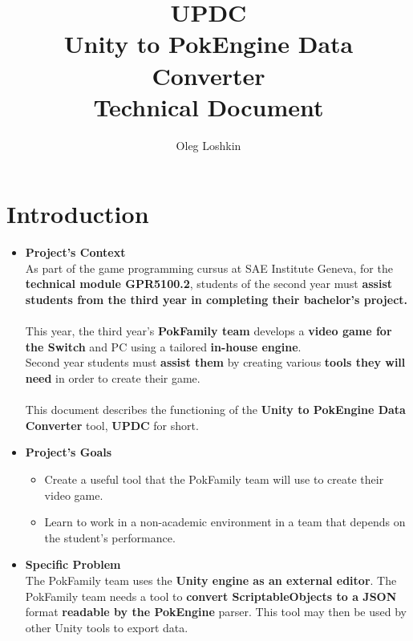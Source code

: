 \documentclass[12pt,a4paper]{article}
\author{Oleg Loshkin}
\title{\textbf{UPDC}\\Unity to PokEngine Data Converter\\\textbf{Technical Document}}
\begin{document}
\maketitle
\section{Introduction}
	\begin{itemize}
		\item \textbf{Project's Context}
		\\As part of the game programming cursus at SAE Institute Geneva, for the \textbf{technical module GPR5100.2}, students of the second year must \textbf{assist students from the third year in completing their bachelor’s project.}\\\\
		This year, the third year's \textbf{PokFamily team} develops a \textbf{video game for the Switch} and PC using a tailored \textbf{in-house engine}.\\Second year students must \textbf{assist them} by creating various \textbf{tools they will need} in order to create their game.\\\\
		This document describes the functioning of the \textbf{Unity to PokEngine Data Converter} tool, \textbf{UPDC} for short.
		
		\item \textbf{Project's Goals}
			\begin{itemize}
				\item Create a useful tool that the PokFamily team will use to create their video game.
				
				\item Learn to work in a non-academic environment in a team that depends on the student’s performance.
				
			\end{itemize}
			
		\item \textbf{Specific Problem}
		\\The PokFamily team uses the \textbf{Unity engine as an external editor}. The PokFamily team needs a tool to \textbf{convert ScriptableObjects to a JSON} format \textbf{readable by the PokEngine} parser. This tool may then be used by other Unity tools to export data.
	\end{itemize}
\newpage
\end{document}
